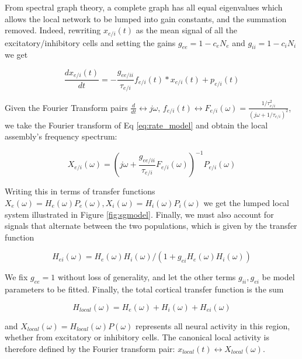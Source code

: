 From spectral graph theory, a complete graph has all equal eigenvalues
which allows the local network to be lumped into gain constants, and the
summation removed. Indeed, rewriting $x_{e/i}(t)$ as the mean signal
of all the excitatory/inhibitory cells and setting the gains $g_{ee} = 1 - c_{e} N_{e}$ and $g_{ii} = 1 - c_{i} N_{i}$ we get

\begin{equation}
\label{eq:mean_sig}
 \frac{dx_{e/i}(t)}{dt} = -\frac{g_{ee/ii}}{\tau_{e/i}} f_{e/i}(t) * x_{e/i}(t) + p_{e/i}(t)
\end{equation}

Given the Fourier Transform pairs $\frac{d}{dt} \leftrightarrow j \omega $,
$f_{e/i}(t) \leftrightarrow F_{e/i}(\omega) = \frac{1/\tau_{e/i}^{2}}{(j \omega + 1/\tau_{e/i})^{2}}$,
we take the Fourier transform of Eq \ref{eq:rate_model} and obtain the local assembly's
frequency spectrum:

\begin{equation}
\label{eq:local_fourier}
X_{e/i}(\omega) = (j \omega + \frac{g_{ee/ii}}{\tau_{e/i}} F_{e/i}(\omega))^{-1} P_{e/i} (\omega) 
\end{equation}

Writing this in terms of transfer functions
$X_{e}(\omega) = H_{e}(\omega)P_{e}(\omega), X_{i}(\omega) = H_{i}(\omega)P_{i}(\omega)$
we get the lumped local system illustrated in Figure \ref{fig:sgmodel}.
Finally, we must also account for signals that alternate between the two
populations, which is given by the transfer function

\begin{equation}
\label{eq:transfun}
H_{ei}(\omega) = H_{e}(\omega)H_{i}(\omega) / (1 + g_{ei} H_{e}(\omega) H_{i}(\omega))
\end{equation}

We fix $g_{ee} = 1$ without loss of generality, and let the
other terms $g_{ii}, g_{ei}$ be model parameters to
be fitted. Finally, the total cortical transfer function is the sum

\begin{equation}
\label{eq:cort_transfun}
H_{local}(\omega) = H_{e}(\omega) + H_{i}(\omega) + H_{ei}(\omega)
\end{equation}

and $X_{local}(\omega) = H_{local}(\omega)P(\omega)$
represents all neural activity in this region, whether from excitatory
or inhibitory cells. The canonical local activity is therefore defined
by the Fourier transform pair: $x_{local}(t) \leftrightarrow X_{local}(\omega)$.

